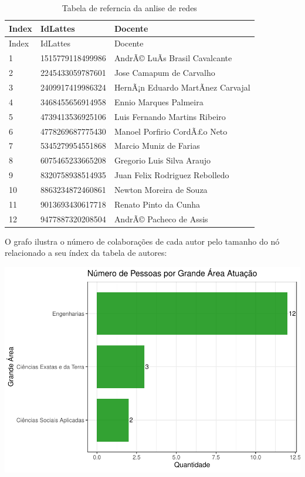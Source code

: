 \documentclass[]{article}
\newenvironment{Shaded}{\begin{snugshade}}{\end{snugshade}}
\newcommand{\DataTypeTok}[1]{\textcolor[rgb]{0.13,0.29,0.53}{#1}}
\newcommand{\FloatTok}[1]{\textcolor[rgb]{0.00,0.00,0.81}{#1}}
\newcommand{\KeywordTok}[1]{\textcolor[rgb]{0.13,0.29,0.53}{\textbf{#1}}}
\newcommand{\NormalTok}[1]{#1}
\newcommand{\OperatorTok}[1]{\textcolor[rgb]{0.81,0.36,0.00}{\textbf{#1}}}
\begin{document}
\begin{longtable}[]{@{}lll@{}}
\caption{Tabela de referncia da anlise de redes}\tabularnewline
\toprule
Index & IdLattes & Docente\tabularnewline
\midrule
\endfirsthead
\toprule
Index & IdLattes & Docente\tabularnewline
\midrule
\endhead
1 & 1515779118499986 & AndrÃ© LuÃ­s Brasil Cavalcante\tabularnewline
2 & 2245433059787601 & Jose Camapum de Carvalho\tabularnewline
3 & 2409917419986324 & HernÃ¡n Eduardo MartÃ­nez Carvajal\tabularnewline
4 & 3468455656914958 & Ennio Marques Palmeira\tabularnewline
5 & 4739413536925106 & Luis Fernando Martins Ribeiro\tabularnewline
6 & 4778269687775430 & Manoel Porfirio CordÃ£o Neto\tabularnewline
7 & 5345279954551868 & Marcio Muniz de Farias\tabularnewline
8 & 6075465233665208 & Gregorio Luis Silva Araujo\tabularnewline
9 & 8320758938514935 & Juan Felix Rodriguez Rebolledo\tabularnewline
10 & 8863234872460861 & Newton Moreira de Souza\tabularnewline
11 & 9013693430617718 & Renato Pinto da Cunha\tabularnewline
12 & 9477887320208504 & AndrÃ© Pacheco de Assis\tabularnewline
\bottomrule
\end{longtable}

O grafo ilustra o número de colaborações de cada autor pelo tamanho do
nó relacionado a seu índex da tabela de autores:

\begin{Shaded}
\end{Shaded}

\includegraphics{LuanFreitas.relatorio2_files/figure-latex/unnamed-chunk-62-1.pdf}
\end{document}
